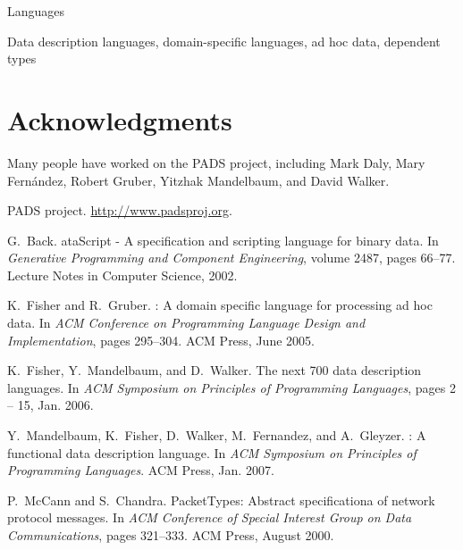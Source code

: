 \documentclass{sigplanconf}
\begin{document}

\terms
Languages

\keywords
Data description languages, domain-specific languages, ad hoc data,
dependent types


\section*{Acknowledgments}
Many people have worked on the PADS project, including 
Mark Daly, Mary Fern\'andez,
Robert Gruber, Yitzhak Mandelbaum, and David Walker. 

%
%
\begin{thebibliography}{1}

{PADS} project.
\newblock \url{http://www.padsproj.org}.

G.~Back.
ata{S}cript - {A} specification and scripting language for binary
  data.
\newblock In {\em Generative Programming and Component Engineering}, volume
  2487, pages 66--77. Lecture Notes in Computer Science, 2002.

K.~Fisher and R.~Gruber.
: A domain specific language for processing ad hoc data.
\newblock In {\em {ACM} Conference on Programming Language Design and
  Implementation}, pages 295--304. {ACM} Press, June 2005.

K.~Fisher, Y.~Mandelbaum, and D.~Walker.
\newblock The next 700 data description languages.
\newblock In {\em {ACM} Symposium on Principles of Programming Languages},
  pages 2 -- 15, Jan. 2006.

Y.~Mandelbaum, K.~Fisher, D.~Walker, M.~Fernandez, and A.~Gleyzer.
: {A} functional data description language.
\newblock In {\em {ACM} Symposium on Principles of Programming Languages}.
  {ACM} Press, Jan. 2007.

P.~Mc{C}ann and S.~Chandra.
\newblock Packet{T}ypes: {A}bstract specificationa of network protocol
  messages.
\newblock In {\em {ACM} Conference of Special Interest Group on Data
  Communications}, pages 321--333. {ACM} Press, August 2000.

\end{thebibliography}

%
\end{document}
